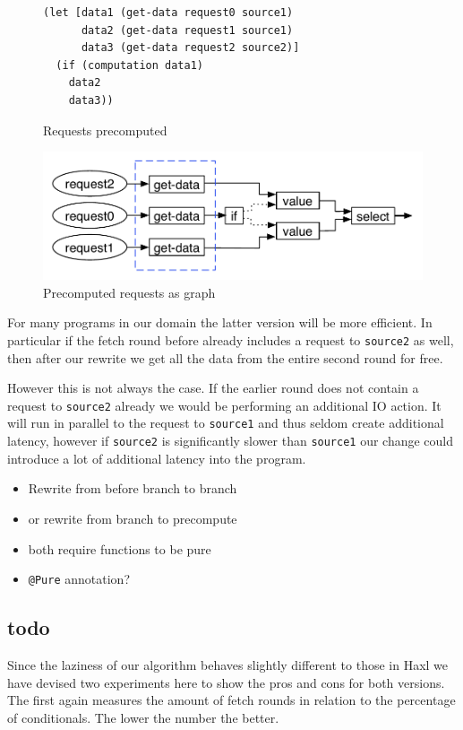 \begin{figure}
\begin{verbatim}
(let [data1 (get-data request0 source1)
      data2 (get-data request1 source1)
      data3 (get-data request2 source2)]
  (if (computation data1)
    data2
    data3))
\end{verbatim}
\caption{Requests precomputed}
\label{fig:requests-precomputed}
\includegraphics[width=\textwidth]{../Figures/requests-precomputed-graph}
\caption{Precomputed requests as graph}
\label{fig:requests-precomputed-graph}
\end{figure}

For many programs in our domain the latter version will be more efficient.
In particular if the fetch round before already includes a request to \texttt{source2} as well, then after our rewrite we get all the data from the entire second round for free.

However this is not always the case.
If the earlier round does not contain a request to \texttt{source2} already we would be performing an additional IO action.
It will run in parallel to the request to \texttt{source1} and thus seldom create additional latency, however if \texttt{source2} is significantly slower than \texttt{source1} our change could introduce a lot of additional latency into the program.

\begin{itemize}
  \item Rewrite from before branch to branch
  \item or rewrite from branch to precompute
  \item both require functions to be pure
  \item \texttt{@Pure} annotation?
\end{itemize}


\subsection{todo}

Since the laziness of our algorithm behaves slightly different to those in Haxl we have devised two experiments here to show the pros and cons for both versions.
The first again measures the amount of fetch rounds in relation to the percentage of conditionals.
The lower the number the better.

